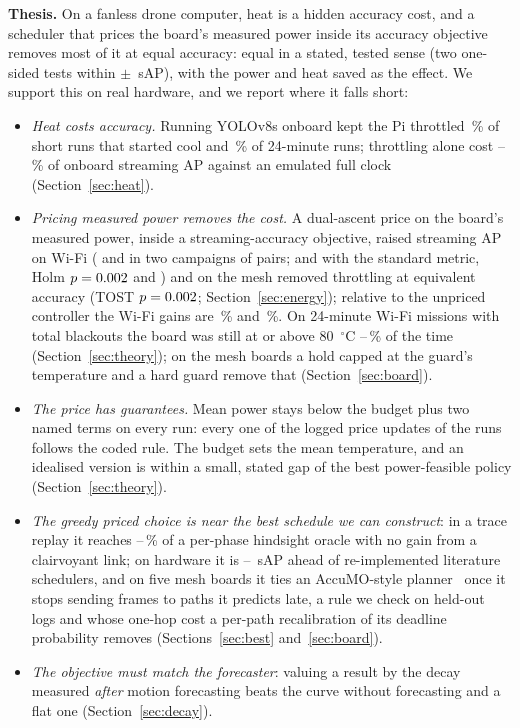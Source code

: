 \documentclass[conference]{IEEEtran}
\begin{document}
\textbf{Thesis.} On a fanless drone computer, heat is a hidden accuracy cost, and a scheduler that prices the board's
measured power inside its accuracy objective removes most of it at equal accuracy: equal in a stated, tested sense
(two one-sided tests within $\pm$\EqMargin~sAP), with the power and heat saved as the effect. We support this on real
hardware, and we report where it falls short:
\begin{itemize}
\item \emph{Heat costs accuracy.} Running YOLOv8s onboard kept the Pi throttled \ThrottleShareCool\,\% of short runs that
started cool and \ThrottleShareLong\,\% of 24-minute runs; throttling alone cost \ThrottleLossMin--\ThrottleLossMax\,\% of
onboard streaming AP against an emulated full clock (Section~\ref{sec:heat}).
\item \emph{Pricing measured power removes the cost.} A dual-ascent price on the board's measured power, inside a
streaming-accuracy objective, raised streaming AP on Wi-Fi (\EnGain{} and \EnRepGain{} in two campaigns of \EnPairs{}
pairs; \EnVdGain{} and \EnRepVdGain{} with the standard metric, Holm $p=0.002{}$ and \EnRepVdHolm{}) and on the mesh
removed throttling at equivalent accuracy (TOST $p=0.002$; Section~\ref{sec:energy}); relative to the unpriced controller the Wi-Fi gains are
\EnGainPct\,\% and \EnRepGainPct\,\%. On 24-minute Wi-Fi missions with total blackouts the board was still at or
above 80~$^\circ$C \HwLongWifiHotMin--\HwLongWifiHotMax\,\% of the time (Section~\ref{sec:theory}); on the mesh boards a
hold capped at the guard's temperature and a hard guard remove that (Section~\ref{sec:board}).
\item \emph{The price has guarantees.} Mean power stays below the budget plus two named terms on every run: every one
of the \ThmUpdates{} logged price updates of the \ThmRuns{} runs follows the coded rule. The budget sets the mean
temperature, and an idealised version is within a small, stated gap of the best power-feasible policy
(Section~\ref{sec:theory}).
\item \emph{The greedy priced choice is near the best schedule we can construct}: in a trace replay it reaches
\OracleShareMin--\OracleShareMax\,\% of a per-phase hindsight oracle with no gain from a clairvoyant link; on hardware
it is \LitBehindMin--\LitBehindMax~sAP ahead of re-implemented literature schedulers, and on five mesh boards it ties an
AccuMO-style planner~\cite{Kong_2023} once it stops sending frames to paths it predicts late, a rule we check on
held-out logs and whose one-hop cost a per-path recalibration of its deadline probability removes (Sections~\ref{sec:best}
and~\ref{sec:board}).
\item \emph{The objective must match the forecaster}: valuing a result by the decay measured \emph{after} motion
forecasting beats the curve without forecasting and a flat one (Section~\ref{sec:decay}).
\end{itemize}
\end{document}
